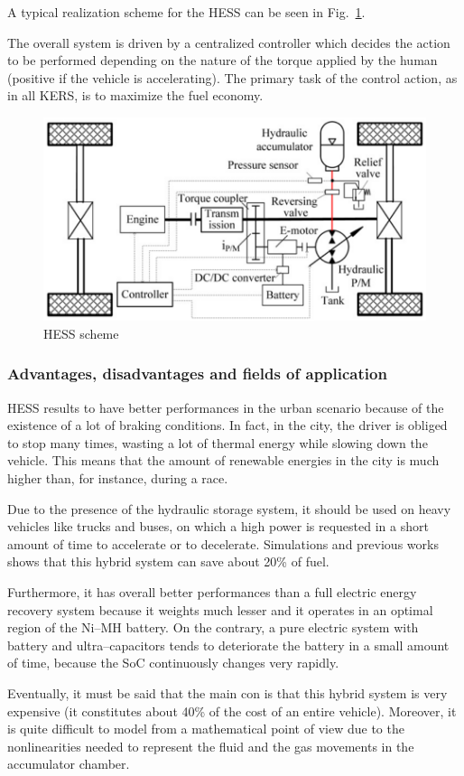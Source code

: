 \documentclass[11pt]{article}
\begin{document}
A typical realization scheme for the HESS can be seen in Fig.~\ref{HESS scheme}.

The overall system is driven by a centralized controller which decides the action to be performed depending on the nature of the torque applied by the human (positive if the vehicle is accelerating). The primary task of the control action, as in all KERS, is to maximize the fuel economy.

\begin{figure}[H]
\centering
\includegraphics[width=.6\textwidth]{Images/HESS scheme}
\caption{HESS scheme}
\label{HESS scheme}
\end{figure}
\subsubsection{Advantages, disadvantages and fields of application}

HESS results to have better performances in the urban scenario because of the existence of a lot of braking conditions. In fact, in the city, the driver is obliged to stop many times, wasting a lot of thermal energy while slowing down the vehicle. This means that the amount of renewable energies in the city is much higher than, for instance, during a race. 

Due to the presence of the hydraulic storage system, it should be used on heavy vehicles like trucks and buses, on which a high power is requested in a short amount of time to accelerate or to decelerate. Simulations and previous works shows that this hybrid system can save about 20\% of fuel.

Furthermore, it has overall better performances than a full electric energy recovery system because it weights much lesser and it operates in an optimal region of the Ni--MH battery. On the contrary, a pure electric system with battery and ultra--capacitors tends to deteriorate the battery in a small amount of time, because the SoC continuously changes very rapidly.

Eventually, it must be said that the main con is that this hybrid system is very expensive (it constitutes about 40\% of the cost of an entire vehicle). Moreover, it is quite difficult to model from a mathematical point of view due to the nonlinearities needed to represent the fluid and the gas movements in the accumulator chamber.
\end{document}
